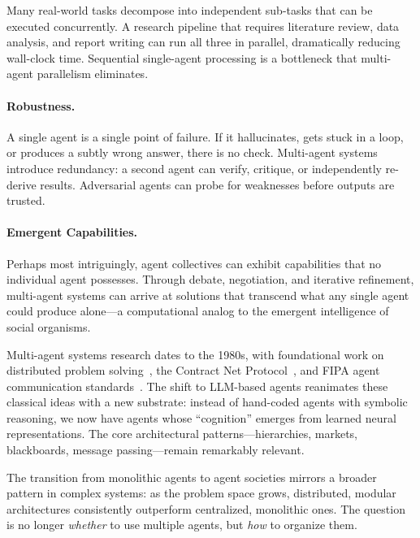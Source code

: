 Many real-world tasks decompose into independent sub-tasks that can be executed concurrently. A research pipeline that requires literature review, data analysis, and report writing can run all three in parallel, dramatically reducing wall-clock time. Sequential single-agent processing is a bottleneck that multi-agent parallelism eliminates.

\paragraph{Robustness.}
\label{robustness.}

A single agent is a single point of failure. If it hallucinates, gets stuck in a loop, or produces a subtly wrong answer, there is no check. Multi-agent systems introduce redundancy: a second agent can verify, critique, or independently re-derive results. Adversarial agents can probe for weaknesses before outputs are trusted.

\paragraph{Emergent Capabilities.}
\label{emergent-capabilities.}

Perhaps most intriguingly, agent collectives can exhibit capabilities that no individual agent possesses. Through debate, negotiation, and iterative refinement, multi-agent systems can arrive at solutions that transcend what any single agent could produce alone---a computational analog to the emergent intelligence of social organisms.

\begin{keybox}
Multi-agent systems research dates to the 1980s, with foundational work on distributed problem solving~\cite{durfee1989distributed}, the Contract Net Protocol~\cite{smith1980contract}, and FIPA agent communication standards~\cite{fipa2002acl}. The shift to LLM-based agents reanimates these classical ideas with a new substrate: instead of hand-coded agents with symbolic reasoning, we now have agents whose ``cognition'' emerges from learned neural representations. The core architectural patterns---hierarchies, markets, blackboards, message passing---remain remarkably relevant.
\end{keybox}

The transition from monolithic agents to agent societies mirrors a broader pattern in complex systems: as the problem space grows, distributed, modular architectures consistently outperform centralized, monolithic ones. The question is no longer \emph{whether} to use multiple agents, but \emph{how} to organize them.

